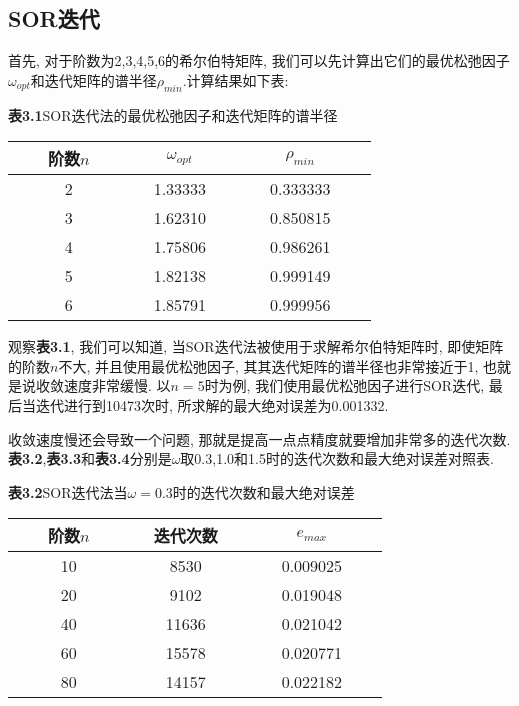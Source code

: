 \documentclass[a4paper,12pt]{article}
\begin{document}
\begin{CJK*}{UTF8}{gbsn}
\section{SOR迭代}
首先, 对于阶数为2,3,4,5,6的希尔伯特矩阵, 我们可以先计算出它们的最优松弛因子$\omega_{opt}$和迭代矩阵的谱半径$\rho_{min}$.计算结果如下表:
\begin{center}
\textbf{表3.1}\quad SOR迭代法的最优松弛因子和迭代矩阵的谱半径\\\vspace{2pt}
\begin{tabular}{ccccccccccccc}
\toprule[1.5pt]
&& 阶数$n$ &&&& $\omega_{opt}$ &&&& $\rho_{min}$ &&\\
\midrule[1.5pt]
&& 2 &&&& 1.33333 &&&& 0.333333 &&\\
&& 3 &&&& 1.62310 &&&& 0.850815 &&\\
&& 4 &&&& 1.75806 &&&& 0.986261 &&\\
&& 5 &&&& 1.82138 &&&& 0.999149 &&\\
&& 6 &&&& 1.85791 &&&& 0.999956 &&\\
\bottomrule[1.5pt]
\end{tabular}
\end{center}\par
观察\textbf{表3.1}, 我们可以知道, 当SOR迭代法被使用于求解希尔伯特矩阵时, 即使矩阵的阶数$n$不大, 并且使用最优松弛因子, 其其迭代矩阵的谱半径也非常接近于1, 也就是说收敛速度非常缓慢.  以$n=5$时为例, 我们使用最优松弛因子进行SOR迭代, 最后当迭代进行到10473次时, 所求解的最大绝对误差为0.001332. \par
收敛速度慢还会导致一个问题, 那就是提高一点点精度就要增加非常多的迭代次数. \textbf{表3.2},\textbf{表3.3}和\textbf{表3.4}分别是$\omega$取0.3,1.0和1.5时的迭代次数和最大绝对误差对照表.
\begin{center}
\textbf{表3.2}\quad SOR迭代法当$\omega=0.3$时的迭代次数和最大绝对误差\\\vspace{2pt}
\begin{tabular}{ccccccccccccc}
\toprule[1.5pt]
&& 阶数$n$ &&&& 迭代次数 &&&& $e_{max}$ &&\\
\midrule[1.5pt]
&& 10 &&&& 8530 &&&& 0.009025 &&\\
&& 20 &&&& 9102 &&&& 0.019048 &&\\
&& 40 &&&& 11636 &&&& 0.021042 &&\\
&& 60 &&&& 15578 &&&& 0.020771 &&\\
&& 80 &&&& 14157 &&&& 0.022182 &&\\
\bottomrule[1.5pt]
\end{tabular}

\end{center}
\end{CJK*}
\end{document}
